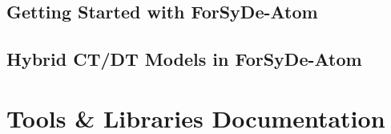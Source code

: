\documentclass{book}
\newcommand*{\RootPath}{./input}%
\begin{document}
\begin{refsection}
  \chapter{Getting Started with {{\sc ForSyDe-Atom}}}
  \label{ch:getting-started}
  \renewcommand*{\RootPath}{%
    \AtomExamplesRoot/getting-started/docs/latex}%
  \graphicspath{{\AtomExamplesRoot/getting-started/docs/latex/figs/}}

  \begin{summary}
    
  \end{summary}
  \minitoc
  \vspace{1ex}
  
  
  
  
  
  
  
  
  
  
  
  
  

  \printbibliography[heading=subbibliography]
\end{refsection}

\begin{refsection}
  \chapter{Hybrid CT/DT Models in {{\sc ForSyDe-Atom}}}
  \label{ch:hybrid}
  \renewcommand*{\RootPath}{\AtomExamplesRoot/hybrid/docs/latex}%
  \graphicspath{{\AtomExamplesRoot/hybrid/docs/latex/figs/}}

  \begin{summary}
    
  \end{summary}
  \minitoc
  \vspace{1ex}
  
  
  
  

  \printbibliography[heading=subbibliography]
\end{refsection}

\part{Tools \& Libraries Documentation}
\label{part:api-documentation}
\end{document}
